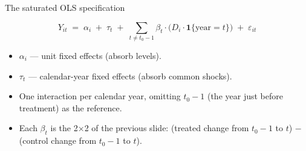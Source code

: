 \documentclass[aspectratio=169,11pt]{beamer}
\begin{document}
\begin{frame}{The saturated OLS specification}
\vspace{0.6em}
\begin{center}
\[
Y_{it} \;=\; \alpha_i \;+\; \tau_t \;+\; \sum_{t \neq t_0 - 1} \beta_t \cdot \big(D_i \cdot \mathbf{1}\{\text{year} = t\}\big) \;+\; \varepsilon_{it}
\]
\end{center}
\vspace{0.6em}
\begin{itemize}\setlength\itemsep{4pt}
  \item $\alpha_i$ --- unit fixed effects (absorb levels).
  \item $\tau_t$ --- calendar-year fixed effects (absorb common shocks).
  \item One interaction per calendar year, omitting $t_0 - 1$ (the year just before treatment) as the reference.
  \item Each $\beta_t$ is the 2$\times$2 of the previous slide: \;(treated change from $t_0{-}1$ to $t$) $-$ (control change from $t_0{-}1$ to $t$).
\end{itemize}
\vspace{0.4em}
\end{frame}
\end{document}
